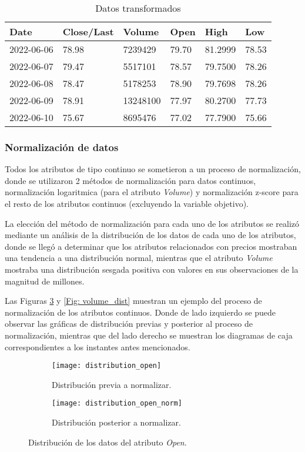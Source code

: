 \begin{table}[hp]
\centering
\caption{Datos transformados}
\begin{tabular}{@{}llllll@{}}
\toprule
Date       & Close/Last & Volume   & Open  & High    & Low   \\ \midrule
2022-06-06 & 78.98      & 7239429  & 79.70 & 81.2999 & 78.53 \\
2022-06-07 & 79.47      & 5517101  & 78.57 & 79.7500 & 78.26 \\
2022-06-08 & 78.47      & 5178253  & 78.90 & 79.7698 & 78.26 \\
2022-06-09 & 78.91      & 13248100 & 77.97 & 80.2700 & 77.73 \\
2022-06-10 & 75.67      & 8695476  & 77.02 & 77.7900 & 75.66 \\ \bottomrule
\end{tabular}
\label{Tab: ProcessedData}
\end{table}


\subsubsection{Normalización de datos}
Todos los atributos de tipo continuo se sometieron a un proceso de normalización, donde se utilizaron 2 métodos de normalización para datos continuos, normalización logaritmica (para el atributo \emph{Volume}) y normalización z-score para el resto de los atributos continuos (excluyendo la variable objetivo).

La elección del método de normalización para cada uno de los atributos se realizó mediante un análisis de la distribución de los datos de cada uno de los atributos, donde se llegó a determinar que los atributos relacionados con precios mostraban una tendencia a una distribución normal, mientras que el atributo \emph{Volume} mostraba una distribución sesgada positiva con valores en sus observaciones de la magnitud de millones.

Las Figuras \ref{Fig: open_dist} y \ref{Fig: volume_dist} muestran un ejemplo del proceso de normalización de los atributos continuos. Donde de lado izquierdo se puede observar las gráficas de distribución previas y posterior al proceso de normalización, mientras que del lado derecho se muestran los diagramas de caja correspondientes a los instantes antes mencionados.

\begin{figure}[hb]
	\centering
	\begin{subfigure}{\textwidth}
         \centering
         \texttt{[image: distribution\_open]}
         \caption{Distribución previa a normalizar.}
         \label{Fig: open_org}
	\end{subfigure}
	\vfill
	\begin{subfigure}{\textwidth}
         \centering
         \texttt{[image: distribution\_open\_norm]}
         \caption{Distribución posterior a normalizar.}
         \label{Fig: open_norm}
	\end{subfigure}
	\caption{Distribución de los datos del atributo \emph{Open}.}
	\label{Fig: open_dist}
\end{figure}

